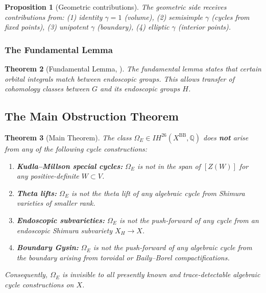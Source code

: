 \documentclass[12pt]{amsart}
\newtheorem{theorem}{Theorem}[section]
\newtheorem{proposition}[theorem]{Proposition}
\theoremstyle{definition}
\newcommand{\Q}{\mathbb{Q}}
\newcommand{\IH}{\mathit{IH}}
\begin{document}
\begin{proposition}[Geometric contributions]
The geometric side receives contributions from: (1) identity $\gamma = 1$ (volume), (2) semisimple $\gamma$ (cycles from fixed points), (3) unipotent $\gamma$ (boundary), (4) elliptic $\gamma$ (interior points).
\end{proposition}

\subsubsection{The Fundamental Lemma}

\begin{theorem}[Fundamental Lemma, \cite{Ngo}]
The fundamental lemma  states that certain orbital integrals match between endoscopic groups. This allows transfer of cohomology classes between $G$ and its endoscopic groups $H$.
\end{theorem}

 
\subsection{The Main Obstruction Theorem}

\begin{theorem}[Main Theorem]
The class $\Omega_E \in \IH^{26}(X^{\mathrm{BB}}, \Q)$ does \textbf{not} arise from any of the following cycle constructions:
\begin{enumerate}
\item \textbf{Kudla–Millson special cycles:} $\Omega_E$ is not in the span of $[Z(W)]$ for any positive-definite $W \subset V$.
\item \textbf{Theta lifts:} $\Omega_E$ is not the theta lift of any algebraic cycle from Shimura varieties of smaller rank.
\item \textbf{Endoscopic subvarieties:} $\Omega_E$ is not the push-forward of any cycle from an endoscopic Shimura subvariety $X_H \to X$.
\item \textbf{Boundary Gysin:} $\Omega_E$ is not the push-forward of any algebraic cycle from the boundary arising from toroidal or Baily–Borel compactifications.
\end{enumerate}
Consequently, $\Omega_E$ is invisible to all presently known and trace-detectable algebraic cycle constructions on $X$.
\end{theorem}
\end{document}
